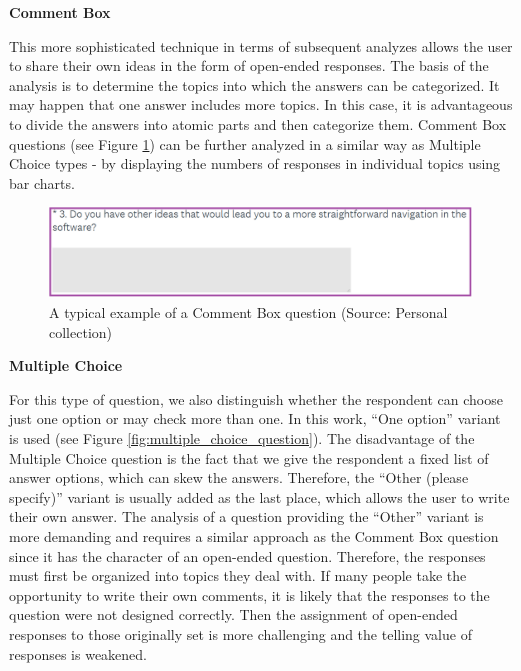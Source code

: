 \documentclass[a4paper,10pt,twoside]{article}
\begin{document}
\smallskip
\vspace*{-0.5cm}
\noindent \textbf {Comment Box}

\noindent This more sophisticated technique in terms of subsequent analyzes allows the user to share their own ideas in the form of open-ended responses. The basis of the analysis is to determine the topics into which the answers can be categorized. It may happen that one answer includes more topics. In this case, it is advantageous to divide the answers into atomic parts and then categorize them. Comment Box questions (see Figure \ref{fig:comment_box_question}) can be further analyzed in a similar way as Multiple Choice types - by displaying the numbers of responses in individual topics using bar charts.

\vspace{0.3cm}
\begin{figure}[hbt!] 
\begin{center}
\includegraphics[width=15cm]{../pictures/comment_box_question.png} 
\caption[A typical example of a Comment Box question]{A typical example of a Comment Box question (Source: Personal collection)}
\label{fig:comment_box_question}
\end{center}
\end{figure}

\newpage
\vspace*{-1cm}
\bigskip
\noindent \textbf {Multiple Choice}

\noindent For this type of question, we also distinguish whether the respondent can choose just one option or may check more than one. In this work, ``One option'' variant is used (see Figure \ref{fig:multiple_choice_question}). The disadvantage of the Multiple Choice question is the fact that we give the respondent a fixed list of answer options, which can skew the answers. Therefore, the ``Other (please specify)'' variant is usually added as the last place, which allows the user to write their own answer. The analysis of a question providing the ``Other'' variant is more demanding and requires a similar approach as the Comment Box question since it has the character of an open-ended question. Therefore, the responses must first be organized into topics they deal with. If many people take the opportunity to write their own comments, it is likely that the responses to the question were not designed correctly. Then the assignment of open-ended responses to those originally set is more challenging and the telling value of responses is weakened.
\end{document}
